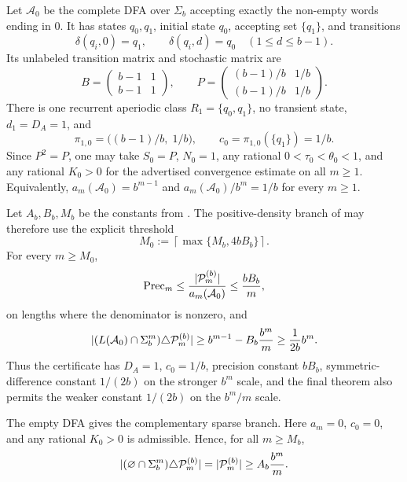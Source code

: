 \begin{example}
  \label{ex:base-ending-zero-certificate}
  Let \(\mathcal A_0\) be the complete DFA over \(\Sigma_b\) accepting
  exactly the non-empty words ending in \(0\). It has states
  \(q_0,q_1\), initial state \(q_0\), accepting set \(\{q_1\}\), and
  transitions
  \[
    \delta(q_i,0)=q_1,\qquad
    \delta(q_i,d)=q_0\quad(1\le d\le b-1).
  \]
  Its unlabeled transition matrix and stochastic matrix are
  \[
    B=\begin{pmatrix} b-1&1\\ b-1&1\end{pmatrix},
    \qquad
    P=\begin{pmatrix} (b-1)/b&1/b\\ (b-1)/b&1/b\end{pmatrix}.
  \]
  There is one recurrent aperiodic class \(R_1=\{q_0,q_1\}\), no
  transient state, \(d_1=D_A=1\), and
  \[
    \pi_{1,0}=\bigl((b-1)/b,\;1/b\bigr),\qquad
    c_0=\pi_{1,0}(\{q_1\})=1/b.
  \]
  Since \(P^2=P\), one may take \(S_0=P\), \(N_0=1\), any rational
  \(0<\tau_0<\theta_0<1\), and any rational \(K_0>0\) for the advertised
  convergence estimate on all \(m\ge1\). Equivalently,
  \(a_m(\mathcal A_0)=b^{m-1}\) and
  \(a_m(\mathcal A_0)/b^m=1/b\) for every \(m\ge1\).

  Let \(A_b,B_b,M_b\) be the constants from
  . The positive-density branch of
   may therefore use the
  explicit threshold
  \[
    M_0:=\left\lceil\max\{M_b,4bB_b\}\right\rceil .
  \]
  For every \(m\ge M_0\),
  \[
    \mathrm{Prec}_m
    \le
    \frac{\lvert \mathcal P_m^{(b)} \rvert}{a_m(\mathcal A_0)}
    \le
    \frac{bB_b}{m},
  \]
  on lengths where the denominator is nonzero, and
  \[
    \lvert (L(\mathcal A_0)\cap\Sigma_b^m)\triangle\mathcal P_m^{(b)} \rvert
    \ge
    b^{m-1}-B_b\frac{b^m}{m}
    \ge
    \frac{1}{2b}b^m .
  \]
  Thus the certificate has \(D_A=1\), \(c_0=1/b\), precision constant
  \(bB_b\), symmetric-difference constant \(1/(2b)\) on the stronger
  \(b^m\) scale, and the final theorem also permits the weaker constant
  \(1/(2b)\) on the \(b^m/m\) scale.

  The empty DFA gives the complementary sparse branch. Here
  \(a_m=0\), \(c_0=0\), and any rational \(K_0>0\) is admissible. Hence, for all
  \(m\ge M_b\),
  \[
    \lvert (\varnothing\cap\Sigma_b^m)\triangle\mathcal P_m^{(b)} \rvert
    =
    \lvert \mathcal P_m^{(b)} \rvert
    \ge
    A_b\frac{b^m}{m}.
  \]
\end{example}

